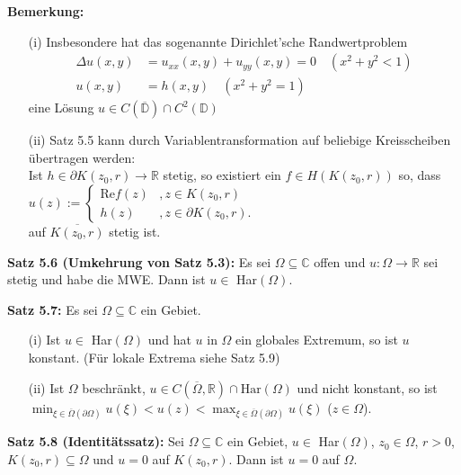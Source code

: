 \documentclass[11pt]{article}
\newcommand{\C}{\mathbb{C}}
\newcommand{\R}{\mathbb{R}}
\newcommand{\D}{\mathbb{D}}
\begin{document}
\textbf{Bemerkung:} 
\vspace{-0.6cm}
\begin{itemize}
\item[(i)] Insbesondere hat das sogenannte Dirichlet'sche Randwertproblem 
\vspace{-0.2cm}
\begin{align*}
\Delta u(x,y) &= u_{xx}(x,y) + u_{yy}(x,y) = 0 \quad (x^2 + y^2 < 1) \\
u(x,y) &= h(x,y) \quad (x^2+y^2=1)
\end{align*}
eine Lösung $u \in C(\overline{\D}) \cap C^2(\D)$
\vspace{-0.2cm}
\item[(ii)] Satz 5.5 kann durch Variablentransformation auf beliebige Kreisscheiben übertragen werden: \\
Ist $h \in \partial K(z_0, r) \to \R$ stetig, so existiert ein $f \in H(K(z_0, r))$ so, dass \\
$ u(z) :=
  \begin{cases} 
\text{Re} f(z) &, z \in K(z_0,r) \\ 
h(z) &, z \in \partial K(z_0,r).
\end{cases}
$ \\
auf $\overline{K(z_0,r)}$ stetig ist.
\end{itemize}
\vspace{-0.3cm}

\textbf{Satz 5.6 (Umkehrung von Satz 5.3):} Es sei $\Omega \subseteq \C$ offen und $u \colon \Omega \to \R$ sei stetig und habe die MWE. Dann ist $u \in$ Har$(\Omega)$.

\textbf{Satz 5.7:} Es sei $\Omega \subseteq \C$ ein Gebiet. 
\vspace{-0.6cm}
\begin{itemize}
\item[(i)] Ist $u \in$ Har$(\Omega)$ und hat $u$ in $\Omega$ ein globales Extremum, so ist $u$ konstant. (Für lokale Extrema siehe Satz 5.9) \vspace{-0.2cm}
\item[(ii)] Ist $\Omega$ beschränkt, $u \in C(\overline{\Omega}, \R) \cap \text{Har}(\Omega)$ und nicht konstant, so ist \\
$\min_{\xi \in \overline{\Omega} (\partial \Omega)} u(\xi) < u(z) < \max_{\xi \in \overline{\Omega} (\partial \Omega)} u(\xi)$ ($z \in \Omega$).
\end{itemize}
\vspace{-0.3cm}

\textbf{Satz 5.8 (Identitätssatz):} Sei $\Omega \subseteq \C$ ein Gebiet, $u \in$ Har$(\Omega)$, $z_0 \in \Omega$, $r > 0$, $K(z_0, r) \subseteq \Omega$ und $u = 0$ auf $K(z_0, r)$. Dann ist $u = 0$ auf $\Omega$.
\end{document}
